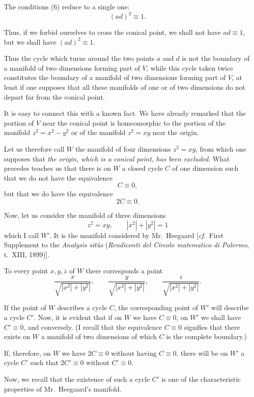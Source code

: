 \documentclass{article}
\begin{document}
The conditions (6) reduce to a single one:
\[ (ad)^{2} \equiv 1. \]

Thus, if we forbid ourselves to cross the conical point, we shall not have $ad \equiv 1$, but we shall have $(ad)^{2} \equiv 1$.

Thus the cycle which turns around the two points $a$ and $d$ is not the boundary of a manifold of two dimensions forming part of $V$, while this cycle taken twice constitutes the boundary of a manifold of two dimensions forming part of $V$, at least if one supposes that all these manifolds of one or of two dimensions do not depart far from the conical point.

It is easy to connect this with a known fact. We have already remarked that the portion of $V$ near the conical point is homeomorphic to the portion of the manifold $z^{2} = x^{2} - y^{2}$ or of the manifold $z^{2} = xy$ near the origin.

Let us therefore call $W$ the manifold of four dimensions $z^{2} = xy$, from which one supposes that \emph{the origin, which is a conical point, has been excluded}. What precedes teaches us that there is on $W$ a closed cycle $C$ of one dimension such that we do not have the equivalence
\[ C \equiv 0, \]
but that we do have the equivalence
\[ 2C \equiv 0. \]

Now, let us consider the manifold of three dimensions
\[ z^{2} = xy, \qquad |x^{2}| + |y^{2}| = 1 \]
which I call $W'$. It is the manifold considered by Mr.~Heegaard [\emph{cf}.\ First Supplement to the \emph{Analysis sitûs} (\emph{Rendiconti del Circolo matematico di Palermo}, t.\ XIII, 1899)].


To every point $x, y, z$ of $W$ there corresponds a point
\[ \frac{x}{\sqrt{|x^{2}| + |y^{2}|}}, \qquad \frac{y}{\sqrt{|x^{2}| + |y^{2}|}}, \qquad \frac{z}{\sqrt{|x^{2}| + |y^{2}|}}. \]

If the point of $W$ describes a cycle $C$, the corresponding point of $W'$ will describe a cycle $C'$. Now, it is evident that if on $W$ we have $C \equiv 0$, on $W'$ we shall have $C' \equiv 0$, and conversely. (I recall that the equivalence $C \equiv 0$ signifies that there exists on $W$ a manifold of two dimensions of which $C$ is the complete boundary.)

If, therefore, on $W$ we have $2C \equiv 0$ without having $C \equiv 0$, there will be on $W'$ a cycle $C'$ such that $2C' \equiv 0$ without $C' \equiv 0$.

Now, we recall that the existence of such a cycle $C'$ is one of the characteristic properties of Mr.~Heegaard's manifold.
\end{document}
